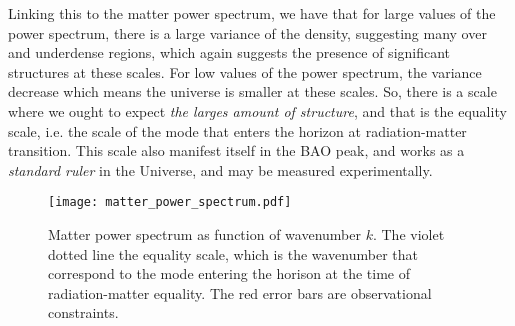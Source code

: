         Linking this to the matter power spectrum, we have that for large values of the power spectrum, there is a large variance of the density, suggesting many over and underdense regions, which again suggests the presence of significant structures at these scales. For low values of the power spectrum, the variance decrease which means the universe is smaller at these scales. So, there is a scale where we ought to expect \textit{the larges amount of structure}, and that is the equality scale, i.e. the scale of the mode that enters the horizon at radiation-matter transition. This scale also manifest itself in the BAO peak, and works as a \textit{standard ruler} in the Universe, and may be measured experimentally. 
    \begin{figure}
        \texttt{[image: matter\_power\_spectrum.pdf]}
        \caption{Matter power spectrum as function of wavenumber $k$. The violet dotted line the equality scale, which is the wavenumber that correspond to the mode entering the horison at the time of radiation-matter equality. The red error bars are observational constraints.}
        \label{fig:m4:matter_power_spectrum}
    \end{figure}